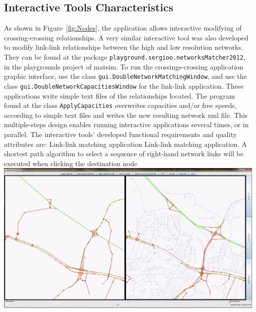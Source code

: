 \subsection{Interactive Tools Characteristics}
As shown in Figure~\ref{fig:Nodes}, the application allows interactive modifying of crossing-crossing relationships. A very similar interactive tool was also developed to modify link-link relationships between the high and low resolution networks. They can be found at the package \lstinline|playground.sergioo.networksMatcher2012|, in the playgrounds project of \gls{matsim}. To run the crossings-crossing application graphic interface, use the class \lstinline|gui.DoubleNetworkMatchingWindow|, and use the class \lstinline|gui.DoubleNetworkCapacitiesWindow| for the link-link application. These applications write simple text files of the relationships located. The program found at the class \lstinline|ApplyCapacities| overwrites capacities and/or free speeds, according to simple text files and writes the new resulting network \gls{xml} file. This multiple-steps design enables running interactive applications several times, or in parallel. The interactive tools' developed functional requirements and quality attributes are:
%
\createfigure
{Link-link matching application}
{Link-link matching application. A shortest path algorithm to select a sequence of right-hand network links will be executed when clicking the destination node}
{\label{fig:Links}}
{\includegraphics[width=1.0\textwidth]{extending/figures/netEdSing/Links.png}}
{}

